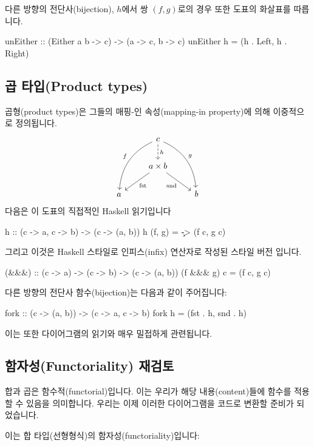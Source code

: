 \documentclass[DaoFP]{subfiles}
\begin{document}
다른 방향의 전단사(bijection), $h$에서 쌍 $(f, g)$로의 경우 또한 도표의 화살표를 따릅니다.
\begin{haskell}
unEither :: (Either a b -> c) -> (a -> c, b -> c)
unEither h = (h . Left, h . Right)
\end{haskell}


\subsection{곱 타입(Product types)}

곱형(product types)은 그들의 매핑-인 속성(mapping-in property)에 의해 이중적으로 정의됩니다.
\[
 \begin{tikzcd}
 & c
\arrow[d, dashed, "h"]
 \arrow[ddl, bend right, "f"']
 \arrow[ddr, bend left, "g"]
\\
&a \times b
 \arrow[dl,  "\text{fst}"]
  \arrow[dr,   "\text{snd}"']
\\
a && b
 \end{tikzcd}
\]
다음은 이 도표의 직접적인 Haskell 읽기입니다
\begin{haskell}
h :: (c -> a, c -> b) -> (c -> (a, b))
h (f, g) = \c -> (f c, g c)
\end{haskell}
그리고 이것은 Haskell 스타일로 인피스(infix) 연산자로 작성된 스타일 버전 \hask{&&&}입니다.
\begin{haskell}
(&&&) :: (c -> a) -> (c -> b) -> (c -> (a, b))
(f &&& g) c = (f c, g c)
\end{haskell}
다른 방향의 전단사 함수(bijection)는 다음과 같이 주어집니다:
\begin{haskell}
fork :: (c -> (a, b)) -> (c -> a, c -> b)
fork h = (fst . h, snd . h)
\end{haskell}
이는 또한 다이어그램의 읽기와 매우 밀접하게 관련됩니다.

\subsection{함자성(Functoriality) 재검토}

합과 곱은 함수적(functorial)입니다. 이는 우리가 해당 내용(content)들에 함수를 적용할 수 있음을 의미합니다. 우리는 이제 이러한 다이어그램을 코드로 변환할 준비가 되었습니다.

이는 합 타입(선형형식)의 함자성(functoriality)입니다:
\end{document}
